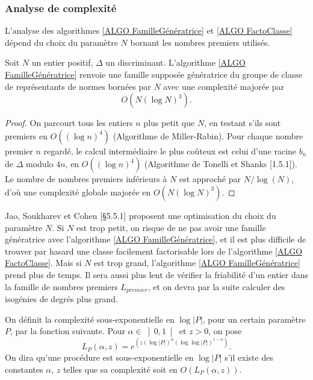 \subsubsection{Analyse de complexité}




L'analyse des algorithmes \ref{ALGO FamilleGénératrice} et \ref{ALGO FactoClasse} dépend du choix du paramètre $N$ bornant les nombres premiers utilisés.  

\begin{Prop}
	Soit $N$ un entier positif, $\Delta$ un discriminant. L'algorithme \ref{ALGO FamilleGénératrice} renvoie une famille supposée génératrice du groupe de classe de représentants de normes bornées par $N$ avec une complexité majorée par 
	\begin{equation*}
		O(N(\log N)^3).
	\end{equation*} 
\end{Prop}

\begin{proof}
	On parcourt tous les entiers $n$ plus petit que $N$, en testant s'ils sont premiers en $O((\log n)^4)$ (Algorithme de Miller-Rabin). Pour chaque nombre premier $n$ regardé, le calcul intermédiaire le plus coûteux est celui d'une racine $b_{n}$ de $\Delta$ modulo $4n$, en $O((\log n)^4)$ (Algorithme de Tonelli et Shanks \cite{Coh00}[1.5.1]). Le nombre de nombres premiers inférieurs à $N$ est approché par $N/\log(N)$, d'où une complexité globale majorée en $O(N(\log N)^3)$.
\end{proof}

Jao, Soukharev \cite{JaoSoukharev} et Cohen \cite{Coh00}[\S 5.5.1] proposent une optimisation du choix du paramètre $N$. Si $N$ est trop petit, on risque de ne pas avoir une famille génératrice avec l'algorithme \ref{ALGO FamilleGénératrice}, et il est plus difficile de trouver par hasard une classe facilement factorisable lors de l'algorithme \ref{ALGO FactoClasse}. Mais si $N$ est trop grand, l'algorithme \ref{ALGO FamilleGénératrice} prend plus de temps. Il sera aussi plus lent de vérifier la friabilité d'un entier dans la famille de nombres premiers $L_{premier}$, et on devra par la suite calculer des isogénies de degrés plus grand. 

\begin{Def}
	On définit la complexité sous-exponentielle en $\log|P|$, pour un certain paramètre $P$, par la fonction suivante. Pour $\alpha\in\left] 0,1 \right[$ et $z>0$, on pose
	\begin{equation*}
		L_P(\alpha,z) = e^{\left( z(\log|P|)^{\alpha}(\log\log|P|)^{1-\alpha}\right) }.
	\end{equation*}
	On dira qu'une procédure est sous-exponentielle en $\log|P|$ s'il existe des constantes $\alpha$, $z$ telles que sa complexité soit en $O(L_P(\alpha,z))$. 
	
\end{Def}

